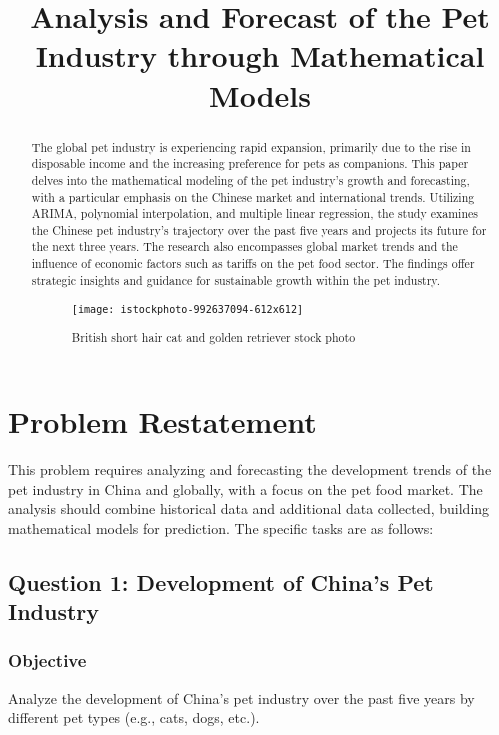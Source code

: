 \documentclass[withoutpreface,bwprint]{cumcmthesis} %
\title{Analysis and Forecast of the Pet Industry through Mathematical Models}
\begin{document}
 \maketitle
 \begin{abstract}
    The global pet industry is experiencing rapid expansion, primarily due to the rise in disposable income and the increasing preference for pets as companions. This paper delves into the mathematical modeling of the pet industry's growth and forecasting, with a particular emphasis on the Chinese market and international trends. Utilizing ARIMA, polynomial interpolation, and multiple linear regression, the study examines the Chinese pet industry's trajectory over the past five years and projects its future for the next three years. The research also encompasses global market trends and the influence of economic factors such as tariffs on the pet food sector. The findings offer strategic insights and guidance for sustainable growth within the pet industry.
\begin{figure}[htbp]
	\centering
	\texttt{[image: istockphoto-992637094-612x612]}
	\caption{British short hair cat and golden retriever stock photo\cite{1}}
\end{figure}

\end{abstract}

\tableofcontents

\section{Problem Restatement}

This problem requires analyzing and forecasting the development trends of the pet industry in China and globally, with a focus on the pet food market. The analysis should combine historical data and additional data collected, building mathematical models for prediction. The specific tasks are as follows:
\subsection{Question 1: Development of China's Pet Industry}

\subsubsection{Objective}
Analyze the development of China's pet industry over the past five years by different pet types (e.g., cats, dogs, etc.).
\end{document}
